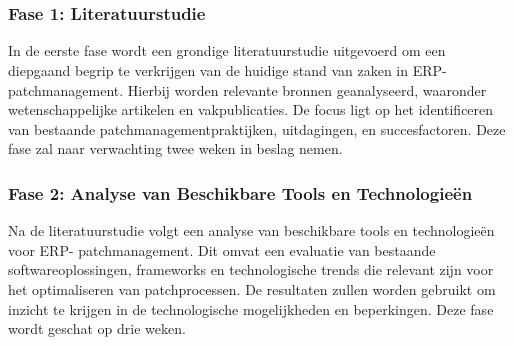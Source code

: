 
\chapter{}%
\label{ch:methodologie}


\subsection{Fase 1: Literatuurstudie}

In de eerste fase wordt een grondige literatuurstudie uitgevoerd om een diepgaand begrip te verkrijgen van de huidige stand van zaken in ERP-patchmanagement. Hierbij worden relevante bronnen geanalyseerd, waaronder wetenschappelijke artikelen en vakpublicaties. De focus ligt op het identificeren van bestaande patchmanagementpraktijken, uitdagingen, en succesfactoren. Deze fase zal naar verwachting twee weken in beslag nemen.

\subsection{Fase 2: Analyse van Beschikbare Tools en Technologieën}

Na de literatuurstudie volgt een analyse van beschikbare tools en technologieën voor ERP- patchmanagement. Dit omvat een evaluatie van bestaande softwareoplossingen, frameworks en technologische trends die relevant zijn voor het optimaliseren van patchprocessen. De resultaten zullen worden gebruikt om inzicht te krijgen in de technologische mogelijkheden en beperkingen. Deze fase wordt geschat op drie weken.

